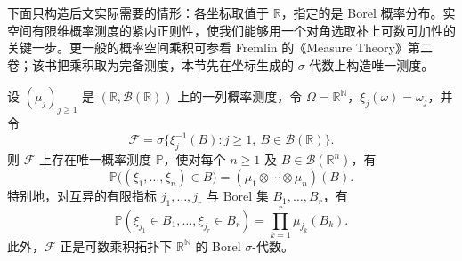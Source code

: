 \ProseParagraphBreak

下面只构造后文实际需要的情形：各坐标取值于 \(\mathbb R\)，指定的是 Borel 概率分布。实空间有限维概率测度的紧内正则性，使我们能够用一个对角选取补上可数可加性的关键一步。更一般的概率空间乘积可参看 Fremlin 的《Measure Theory》第二卷\cite[Definition 254C, Theorem 254F]{Fremlin2016Measure}；该书把乘积取为完备测度，本节先在坐标生成的 \(\sigma\)-代数上构造唯一测度。

\begin{theorem}\label{b1:thm:30-countable-product}
设 \((\mu_j)_{j\geq1}\) 是 \((\mathbb R,\mathcal B(\mathbb R))\) 上的一列概率测度，令 \(\Omega=\mathbb R^{\mathbb N}\)，\(\xi_j(\omega)=\omega_j\)，并令
\[
 \mathcal F=\sigma\{\xi_j^{-1}(B):j\geq1,\ B\in\mathcal B(\mathbb R)\}.
\]
则 \(\mathcal F\) 上存在唯一概率测度 \(\mathbb P\)，使对每个 \(n\geq1\) 及 \(B\in\mathcal B(\mathbb R^n)\)，有
\[
 \mathbb P\bigl((\xi_1,\ldots,\xi_n)\in B\bigr)
 =(\mu_1\otimes\cdots\otimes\mu_n)(B).
\]
特别地，对互异的有限指标 \(j_1,\ldots,j_r\) 与 Borel 集 \(B_1,\ldots,B_r\)，有
\[
 \mathbb P(\xi_{j_1}\in B_1,\ldots,\xi_{j_r}\in B_r)
 =\prod_{k=1}^r\mu_{j_k}(B_k).
\]
此外，\(\mathcal F\) 正是可数乘积拓扑下 \(\mathbb R^{\mathbb N}\) 的 Borel \(\sigma\)-代数。
\end{theorem}

